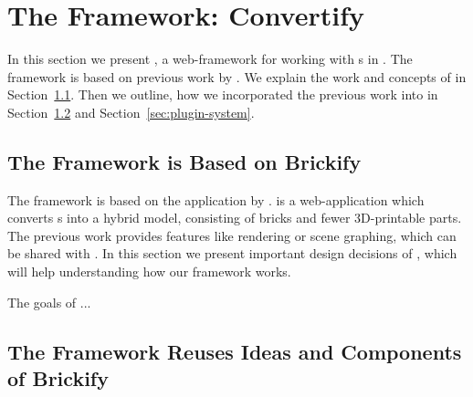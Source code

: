 \documentclass[../ClassicThesis.tex]{subfiles}
\begin{document}
\section{The Framework: Convertify}
\label{sec:framework-convertify}

In this section we present {\convertify}, a web-framework for working
with {\threedmodel}s in {\threejs}. The framework is based on
previous work by \citeauthor{brickify-thesis}. We explain the work and
concepts of \citeauthor{brickify-thesis} in
Section~\ref{sec:based-brickify}. Then we outline, how we incorporated
the previous work into {\convertify} in
Section~\ref{sec:reuses-brickify} and Section~\ref{sec:plugin-system}.

\subsection{The Framework is Based on Brickify}
\label{sec:based-brickify}

The framework {\convertify} is based on the application {\brickify} by
\citeauthor{brickify-thesis}. {\brickify} is a web-application which
converts {\threedmodel}s into a hybrid model, consisting of {\lego}
bricks and fewer 3D-printable parts. The previous work provides
features like rendering or scene graphing, which can be shared with
{\convertify}. In this section we present important design decisions
of {\brickify}, which will help understanding how our framework works.

The goals of {\brickify} ...





\subsection{The Framework Reuses Ideas and Components of Brickify}
\label{sec:reuses-brickify}
\end{document}
